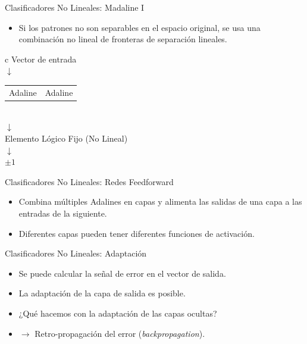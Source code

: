 \documentclass[aspectratio=169,utf8,spanish]{beamer}
\begin{document}
\begin{frame}{Clasificadores No Lineales: Madaline I}
  \begin{itemize}
    \item Si los patrones no son separables en el espacio original, se usa una combinación no lineal de fronteras de separación lineales.
  \end{itemize}
  \begin{center}
    \begin{tabular}{c}
      Vector de entrada \\
      $\downarrow$ \\
      \begin{tabular}{cc}
        Adaline & Adaline \\
      \end{tabular} \\
      $\downarrow$ \\
      Elemento Lógico Fijo (No Lineal) \\
      $\downarrow$ \\
      $\pm 1$
    \end{tabular}
  \end{center}
\end{frame}

\begin{frame}{Clasificadores No Lineales: Redes Feedforward}
  \begin{itemize}
    \item Combina múltiples Adalines en capas y alimenta las salidas de una capa a las entradas de la siguiente.
    \item Diferentes capas pueden tener diferentes funciones de activación.
  \end{itemize}
\end{frame}

\begin{frame}{Clasificadores No Lineales: Adaptación}
  \begin{itemize}
    \item Se puede calcular la señal de error en el vector de salida.
    \item La adaptación de la capa de salida es posible.
    \item ¿Qué hacemos con la adaptación de las capas ocultas?
    \item $\to$ Retro-propagación del error (\textit{backpropagation}).
  \end{itemize}
\end{frame}

\end{document}
